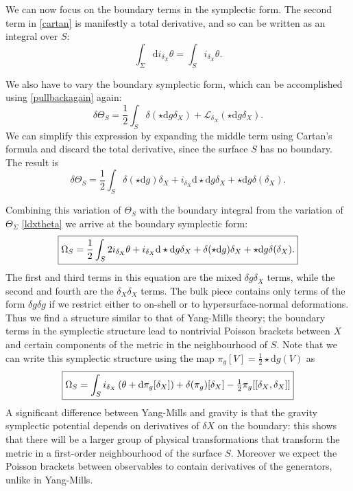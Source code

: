 \documentclass[a4paper,11pt]{article}
\newcommand{\be}{\begin{equation}}
\newcommand{\ee}{\end{equation}}
\def\rd{\mathrm{d}}
\begin{document}
We can now focus on the boundary terms in the symplectic form.
The second term  in \eqref{cartan} is manifestly a total derivative, and so can be written as an integral over $S$:
\begin{equation} \label{ldxtheta}
\int_{\Sigma} \rd i_{\delta_X} \theta = \int_{S} i_{\delta_{X}} \theta.
\end{equation}

We also have to vary the boundary symplectic form, which can be accomplished using \eqref{pullbackagain} again:
\begin{equation} \label{deltaThetaS}
\delta \Theta_S = \frac12 \int_{S} \delta (\star \rd g \delta_X) + \mathcal{L}_{\delta_X} (\star \rd g \delta_X).
\end{equation}
We can simplify this expression 
by expanding the middle term using Cartan's formula and discard the total derivative, since the surface $S$ has no boundary.
The result is
\begin{equation}
\delta \Theta_S = \frac12 \int_{S} \delta (\star \rd g) \delta_X + i_{\delta_X} \rd \star \rd g \delta_X + \star \rd g \delta(\delta_X).
\end{equation}

Combining this variation of $\Theta_S$ with the boundary integral from the variation of $\Theta_\Sigma$ \eqref{ldxtheta} we arrive at the boundary symplectic form:
\be \boxed{ \label{OmegaSpi}
\Omega_S = \frac12 \int_{S} 2 i_{\delta_X} \theta +  i_{\delta_X} \rd \star \rd g \delta_X  + \delta(\star \rd g) \delta_X +  \star \rd g \delta (\delta_X).
}
\ee
The first and third terms in this equation are the mixed $\delta g \delta_X$ terms, while the second and fourth  are the $\delta_X \delta_X$ terms.
The bulk piece contains only terms of the form $\delta g \delta g$ if we restrict either to on-shell or to hypersurface-normal deformations.
Thus we find a structure similar to that of Yang-Mills theory; the boundary terms in the symplectic structure lead to nontrivial Poisson brackets between $X$ and certain components of the metric in the neighbourhood of $S$.
Note that we can write this symplectic structure using the map $\pi_g[V] =\tfrac12 \star \rd g (V)$ as 
\be \boxed{ \label{OmegaS}
\Omega_S =  \int_{S}  i_{\delta_X} \left( \theta + \rd \pi_g[ \delta_X] \right)  + \delta(\pi_g) [\delta_X] -\tfrac12  \pi_g[[\delta_X,\delta_X]]
}
\ee
A significant difference between Yang-Mills and gravity is that the gravity symplectic potential depends on derivatives of $\delta X$ on the boundary: this shows that there will be a larger group of physical transformations that transform the metric in a first-order neighbourhood of the surface $S$.
Moreover we expect the Poisson brackets between observables to contain derivatives of the generators, unlike in Yang-Mills.
\end{document}
